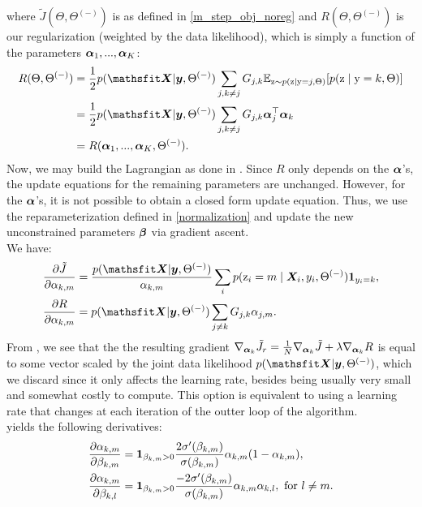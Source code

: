 where $\tilde{J}(\Theta, \Theta^{(-)})$ is as defined in \eqref{m_step_obj_noreg} and $R(\Theta, \Theta^{(-)})$ is our regularization (weighted by the data likelihood), which is simply a function of the parameters ${\bm{\alpha}}_1,...,{\bm{\alpha}}_K$:
\begin{align}
R(\Theta, \Theta^{(-)}) &= \frac{1}{2}p(\tX|\vy,\Theta^{(-)}) \sum_{j,k\neq j} \emG_{j,k} \E_{\rz \sim p(\rz \mid \ry=j, \Theta)} [ p(\rz \mid \ry=k, \Theta) ] \nonumber\\
&= \frac{1}{2}p(\tX|\vy,\Theta^{(-)}) \sum_{j,k\neq j} \emG_{j,k} \valpha_j \transp \valpha_k \nonumber\\
&= R(\valpha_1,...,\valpha_K,\Theta^{(-)}).
\end{align}
Now, we may build the Lagrangian as done in . Since $R$ only depends on the ${\bm{\alpha}}$'s, the update equations for the remaining parameters are unchanged. However, for the ${\bm{\alpha}}$'s, it is not possible to obtain a closed form update equation. Thus, we use the reparameterization defined in \eqref{normalization} and update the new unconstrained parameters ${\bm{\beta}}$ via gradient ascent. \\
We have:
\begin{align}
& \frac{\partial \tilde{J}}{\partial \alpha_{k,m}} = \frac{p(\tX|\vy,\Theta^{(-)})}{\alpha_{k,m}} \sum_i p(\rz_i=m \mid \mX_i,y_i,\Theta^{(-)}) \1_{y_i=k} \label{dJ_dalpha}, \\
& \frac{\partial R}{\partial \alpha_{k,m}} = p(\tX|\vy,\Theta^{(-)}) \sum_{j \neq k} \emG_{j,k} \alpha_{j,m}. \label{dR_dalpha}
\end{align}
From , we see that the the resulting gradient $\nabla_{\boldsymbol{\alpha}_k} \tilde{J}_r = \frac{1}{N}\nabla_{\boldsymbol{\alpha}_k} \tilde{J} + \lambda \nabla_{\boldsymbol{\alpha}_k} R$ is equal to some vector scaled by the joint data likelihood $p(\tX|\vy,\Theta^{(-)})$, which we discard since it only affects the learning rate, besides being usually very small and somewhat costly to compute. This option is equivalent to using a learning rate that changes at each iteration of the outter loop of the algorithm. \\
 yields the following derivatives:
\begin{align}
& \frac{\partial \alpha_{k,m}}{\partial \beta_{k,m}} = \bm{1}_{\beta_{k,m} > 0} \frac{2\sigma'(\beta_{k,m})}{\sigma(\beta_{k,m})} \alpha_{k,m} (1 - \alpha_{k,m}), \\
& \frac{\partial \alpha_{k,m}}{\partial \beta_{k,l}} = \bm{1}_{\beta_{k,m} > 0} \frac{-2\sigma'(\beta_{k,m})}{\sigma(\beta_{k,m})} \alpha_{k,m} \alpha_{k,l}, \text{ for } l \neq m.
\end{align}
